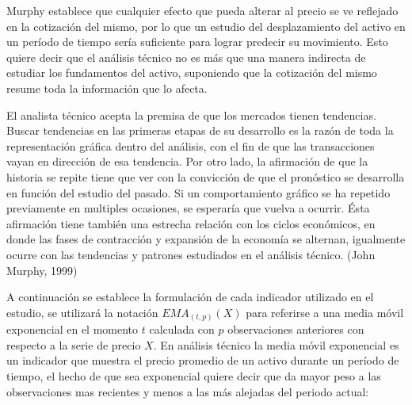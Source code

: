 \documentclass[a4paper,12pt]{Latex/Classes/PhDthesisPSnPDF}
\begin{document}
Murphy establece que cualquier efecto que pueda alterar al precio se ve reflejado en la cotización del mismo, por lo que un estudio del desplazamiento del activo en un período de tiempo sería suficiente para lograr predecir su movimiento. Esto quiere decir que el análisis técnico no es más que una manera indirecta de estudiar los fundamentos del activo, suponiendo que la cotización del mismo resume toda la información que lo afecta. 

El analista técnico acepta la premisa de que los mercados tienen tendencias. Buscar tendencias en las primeras etapas de su desarrollo es la razón de toda la representación gráfica dentro del análisis, con el fin de que las transacciones vayan en dirección de esa tendencia. Por otro lado, la afirmación de que la historia se repite tiene que ver con la convicción de que el pronóstico se desarrolla en función del estudio del pasado. Si un comportamiento gráfico se ha repetido previamente en multiples ocasiones, se esperaría que vuelva a ocurrir. Ésta afirmación tiene también una estrecha relación con los ciclos económicos, en donde las fases de contracción y expansión de la economía se alternan, igualmente ocurre con las tendencias y patrones estudiados en el análisis técnico. (John Murphy, 1999) 

A continuación se establece la formulación de cada indicador utilizado en el estudio, se utilizará la notación $EMA_{(t, p)}(X)$ para referirse a una media móvil exponencial en el momento $t$ calculada con $p$ observaciones anteriores con respecto a la serie de precio $X$. En análisis técnico la media móvil exponencial es un indicador que muestra el precio promedio de un activo durante un período de tiempo, el hecho de que sea exponencial quiere decir que da mayor peso a las observaciones mas recientes y menos a las más alejadas del periodo actual:
\end{document}
